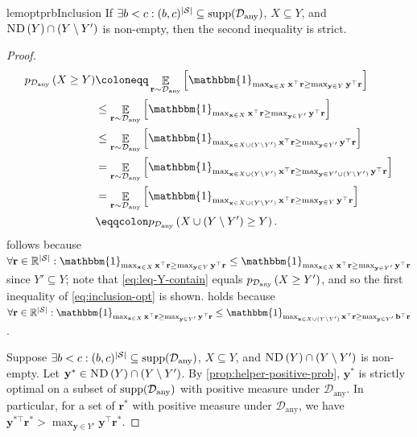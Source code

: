 \documentclass{article}
\renewcommand{\abs}[1]{\left|#1\right|}
\newcommand*{\prn}[1]{\left(#1\right)}
\newcommand*{\brx}[1]{\left[#1\right]}
\newcommand*{\defeq}{\coloneqq} %
\newcommand*{\eqdef}{\eqqcolon} %
\newcommand*{\x}{\mathbf{x}} %
\newcommand*{\bv}{\mathbf{b}}
\newcommand*{\reals}{\mathbb{R}}
\newcommand*{\upsc}[1]{\text{\upshape\textsc{#1}}}
\newcommand*{\St}{\mathcal{S}}
\newcommand*{\rf}{\mathbf{r}} %
\newcommand*{\rewardVS}{\reals^{\abs{\St}}} %
\newcommand*{\D}{\mathcal{D}} %
\newcommand*{\Dany}{\D_{\text{any}}}
\DeclareMathOperator*{\opE}{\mathbb{E}}
\newcommand*{\E}[2]{\opE_{#1}\brx{#2}} %
\newcommand*{\ND}[1]{\upsc{ND}\prn{#1}}
\newcommand*{\indic}[1]{\mathbbm{1}_{#1}} %
\theoremstyle{definition}
\begin{document}
\begin{appendices}
\begin{restatable}{lem}{optprbInclusion}
If $\exists b<c: (b,c)^{\abs{\St}}\subseteq \supp[\Dany]$, $X\subseteq Y$, and $\ND{Y}\cap \prn{Y\setminus Y'}$ is non-empty, then the second inequality is strict.
\end{restatable}
\begin{proof}
\begin{align}
    \phelper{X\geq Y}[\Dany]&\defeq \E{\rf \sim \Dany}{\indic{\max_{\x\in X} \x^\top \rf \geq \max_{\mathbf{y} \in Y} \mathbf{y}^\top \rf}}\\
    &\leq \E{\rf \sim \Dany}{\indic{\max_{\x\in X} \x^\top \rf \geq \max_{\mathbf{y} \in Y'} \mathbf{y}^\top \rf}}\label{eq:leq-Y-contain}\\
    &\leq \E{\rf \sim \Dany}{\indic{\max_{\x\in X\cup (Y\setminus Y')} \x^\top \rf \geq \max_{\mathbf{y} \in Y'} \mathbf{y}^\top \rf}}\label{eq:leq-Y-union}\\
    &= \E{\rf \sim \Dany}{\indic{\max_{\x\in X\cup (Y\setminus Y')} \x^\top \rf \geq \max_{\mathbf{y} \in Y'\cup (Y\setminus Y')} \mathbf{y}^\top \rf}}\label{eq:leq-Y-union-2}\\
    &=\E{\rf \sim \Dany}{\indic{\max_{\x\in X\cup (Y\setminus Y')} \x^\top \rf \geq \max_{\mathbf{y} \in Y} \mathbf{y}^\top \rf}}\\
    &\eqdef \phelper{X\cup\prn{Y\setminus Y'}\geq Y}[\Dany].
\end{align}
 follows because $\forall \rf \in \rewardVS: \indic{\max_{\x\in X} \x^\top \rf \geq \max_{\mathbf{y} \in Y} \mathbf{y}^\top \rf}\leq \indic{\max_{\x\in X} \x^\top \rf \geq \max_{\mathbf{y} \in Y'} \mathbf{y}^\top \rf}$ since $Y' \subseteq Y$; note that \cref{eq:leq-Y-contain} equals $\phelper{X\geq Y'}[\Dany]$, and so the first inequality of \cref{eq:inclusion-opt} is shown.  holds because $\forall \rf \in \rewardVS: \indic{\max_{\x\in X} \x^\top \rf \geq \max_{\mathbf{y} \in Y'} \mathbf{y}^\top \rf}\leq \indic{\max_{\x\in X\cup (Y\setminus Y')} \x^\top \rf \geq \max_{\mathbf{y} \in Y'} \bv^\top \rf}$. 

Suppose $\exists b<c: (b,c)^{\abs{\St}}\subseteq \supp[\Dany]$, $X\subseteq Y$, and $\ND{Y}\cap \prn{Y\setminus Y'}$ is non-empty. Let $\mathbf{y}^*\in \ND{Y}\cap \prn{Y\setminus Y'}$. By \cref{prop:helper-positive-prob}, $\mathbf{y}^*$ is strictly optimal on a subset of $\supp[\Dany]$ with positive measure under $\Dany$. In particular, for a set of $\rf^*$ with positive measure under $\Dany$, we have $\mathbf{y}^{*\top}\rf^*> \max_{\mathbf{y}\in Y'} \mathbf{y}^\top \rf^*.$


\end{proof}
\end{appendices}
\end{document}
